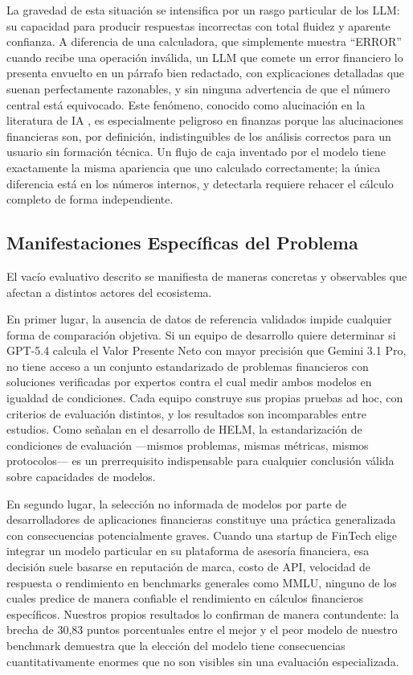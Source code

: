 \documentclass[12pt,a4paper]{article}
\begin{document}
La gravedad de esta situación se intensifica por un rasgo particular de los LLM: su capacidad para producir respuestas incorrectas con total fluidez y aparente confianza. A diferencia de una calculadora, que simplemente muestra ``ERROR'' cuando recibe una operación inválida, un LLM que comete un error financiero lo presenta envuelto en un párrafo bien redactado, con explicaciones detalladas que suenan perfectamente razonables, y sin ninguna advertencia de que el número central está equivocado. Este fenómeno, conocido como alucinación en la literatura de IA \citep{Huang2023}, es especialmente peligroso en finanzas porque las alucinaciones financieras son, por definición, indistinguibles de los análisis correctos para un usuario sin formación técnica. Un flujo de caja inventado por el modelo tiene exactamente la misma apariencia que uno calculado correctamente; la única diferencia está en los números internos, y detectarla requiere rehacer el cálculo completo de forma independiente.

\subsection{Manifestaciones Específicas del Problema}

El vacío evaluativo descrito se manifiesta de maneras concretas y observables que afectan a distintos actores del ecosistema.

En primer lugar, la ausencia de datos de referencia validados impide cualquier forma de comparación objetiva. Si un equipo de desarrollo quiere determinar si GPT-5.4 calcula el Valor Presente Neto con mayor precisión que Gemini 3.1 Pro, no tiene acceso a un conjunto estandarizado de problemas financieros con soluciones verificadas por expertos contra el cual medir ambos modelos en igualdad de condiciones. Cada equipo construye sus propias pruebas ad hoc, con criterios de evaluación distintos, y los resultados son incomparables entre estudios. Como señalan \citet{Liang2023} en el desarrollo de HELM, la estandarización de condiciones de evaluación ---mismos problemas, mismas métricas, mismos protocolos--- es un prerrequisito indispensable para cualquier conclusión válida sobre capacidades de modelos.

En segundo lugar, la selección no informada de modelos por parte de desarrolladores de aplicaciones financieras constituye una práctica generalizada con consecuencias potencialmente graves. Cuando una startup de FinTech elige integrar un modelo particular en su plataforma de asesoría financiera, esa decisión suele basarse en reputación de marca, costo de API, velocidad de respuesta o rendimiento en benchmarks generales como MMLU, ninguno de los cuales predice de manera confiable el rendimiento en cálculos financieros específicos. Nuestros propios resultados lo confirman de manera contundente: la brecha de 30,83 puntos porcentuales entre el mejor y el peor modelo de nuestro benchmark demuestra que la elección del modelo tiene consecuencias cuantitativamente enormes que no son visibles sin una evaluación especializada.
\end{document}
